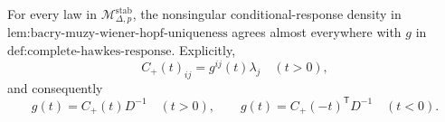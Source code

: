 For every law in \(\mathcal M_{\Delta,p}^{\mathrm{stab}}\), the nonsingular conditional-response density in \(\text{lem:bacry-muzy-wiener-hopf-uniqueness}\) agrees almost everywhere with \(g\) in \(\text{def:complete-hawkes-response}\).  Explicitly,
\[
 C_{+}(t)_{ij}=g^{ij}(t)\lambda_j\quad(t>0),
\]
and consequently
\[
 g(t)=C_{+}(t)D^{-1}\quad(t>0),\qquad
 g(t)=C_{+}(-t)^{\mathsf T}D^{-1}\quad(t<0).
\]